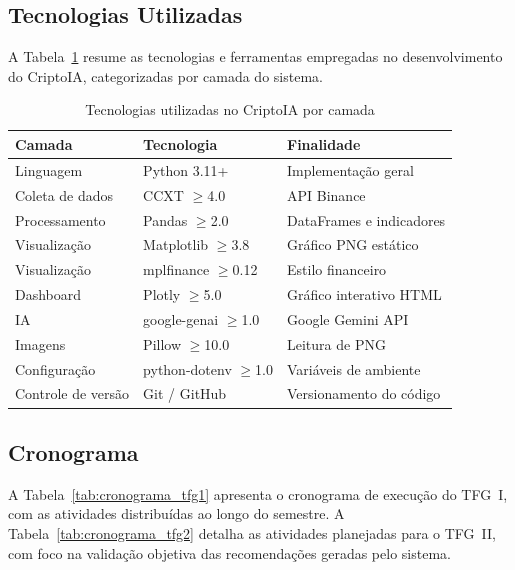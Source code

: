 \documentclass[conference]{IEEEtran}
\begin{document}
\subsection{Tecnologias Utilizadas}

A Tabela~\ref{tab:tecnologias} resume as tecnologias e ferramentas empregadas no desenvolvimento do CriptoIA, categorizadas por camada do sistema.

\begin{table}[H]
  \centering
  \caption{Tecnologias utilizadas no CriptoIA por camada}
  \label{tab:tecnologias}
  \begin{tabular}{lll}
    \toprule
    \textbf{Camada} & \textbf{Tecnologia} & \textbf{Finalidade} \\
    \midrule
    Linguagem       & Python 3.11+         & Implementação geral \\
    Coleta de dados & CCXT $\geq$4.0       & API Binance \\
    Processamento   & Pandas $\geq$2.0     & DataFrames e indicadores \\
    Visualização    & Matplotlib $\geq$3.8 & Gráfico PNG estático \\
    Visualização    & mplfinance $\geq$0.12 & Estilo financeiro \\
    Dashboard       & Plotly $\geq$5.0     & Gráfico interativo HTML \\
    IA              & google-genai $\geq$1.0 & Google Gemini API \\
    Imagens         & Pillow $\geq$10.0    & Leitura de PNG \\
    Configuração    & python-dotenv $\geq$1.0 & Variáveis de ambiente \\
    Controle de versão & Git / GitHub      & Versionamento do código \\
    \bottomrule
  \end{tabular}
\end{table}

\subsection{Cronograma}

A Tabela~\ref{tab:cronograma_tfg1} apresenta o cronograma de execução do TFG~I, com as atividades distribuídas ao longo do semestre. A Tabela~\ref{tab:cronograma_tfg2} detalha as atividades planejadas para o TFG~II, com foco na validação objetiva das recomendações geradas pelo sistema.
\end{document}
